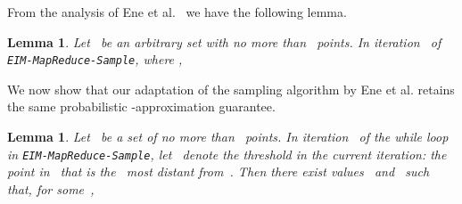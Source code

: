 \documentclass[11pt]{article}
\newtheorem{lemma}[theorem]{Lemma}
\begin{document}
From the analysis of Ene et al.~\cite{ene2011fast} we have the following lemma.
\begin{lemma}
\label{unsatisfied}
Let~ be an arbitrary set with no more than~ points. 
In iteration~ of \sloppy\texttt{EIM{-}MapReduce}\texttt{{-}Sample}, where ,

\end{lemma}


We now show that our adaptation of the sampling algorithm by Ene et al. retains the same probabilistic -approximation guarantee.


\begin{lemma}
\label{chernoff}
Let~ be a set of no more than~ points.
In iteration~ of the while loop in
\sloppy\texttt{EIM{-}MapReduce}\texttt{{-}Sample},
let~ denote the threshold in the current iteration:
the  point in~ that is the~ most distant
from~.
Then there exist values~ and~ such that, for some~,

\end{lemma}
\end{document}

